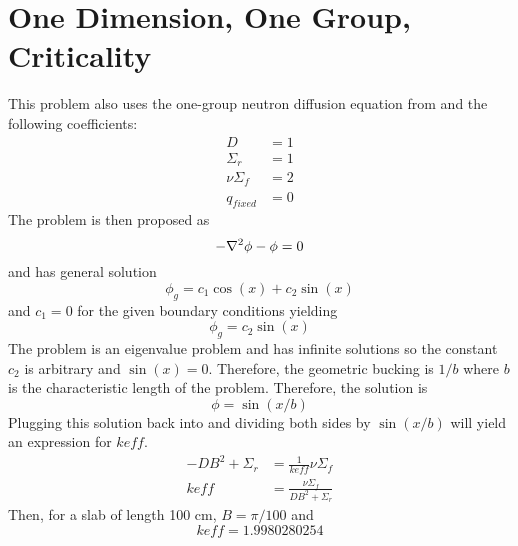 \section{One Dimension, One Group, Criticality} \label{sc:onegroup1d}
  This problem also uses the one-group neutron diffusion equation from 
   and the following coefficients:
  \begin{align*}
    D &= 1\\
    \Sigma_r &= 1\\
    \nu \Sigma_f &= 2\\
    q_{fixed} &= 0
  \end{align*}
  The problem is then proposed as 
  \begin{equation}
    -\mathbf{\nabla}^2 \phi - \phi = 0 
  \end{equation}
  and has general solution
  \begin{equation}
    \phi_g = c_1 \cos(x) + c_2 \sin(x)
  \end{equation}
  and $c_1 = 0 $ for the given boundary conditions yielding
  \begin{equation} \label{eq:sinshape}
    \phi_g = c_2 \sin(x)
  \end{equation}
  The problem is an eigenvalue problem and has infinite solutions so the 
  constant $c_2$ is arbitrary and $\sin(x)=0$. Therefore, the geometric 
  bucking is $1/b$ where $b$ is the characteristic length of the problem. 
  Therefore, the solution is 
  \begin{equation} \label{eq:onedimensionsol}
    \phi = \sin(x/b)
  \end{equation}
  Plugging this solution back into  and dividing both sides
  by $\sin(x/b)$ will yield an expression for $keff$.
  \begin{align}
    -D B^2 + \Sigma_r &= \frac{1}{keff} \nu \Sigma_f \\
    keff &= \frac{\nu \Sigma_f}{DB^2 + \Sigma_r} \label{eq:keff1d}
  \end{align}
  Then, for a slab of length 100 cm, $B = \pi / 100$ and
  \[ keff = 1.9980280254 \]
